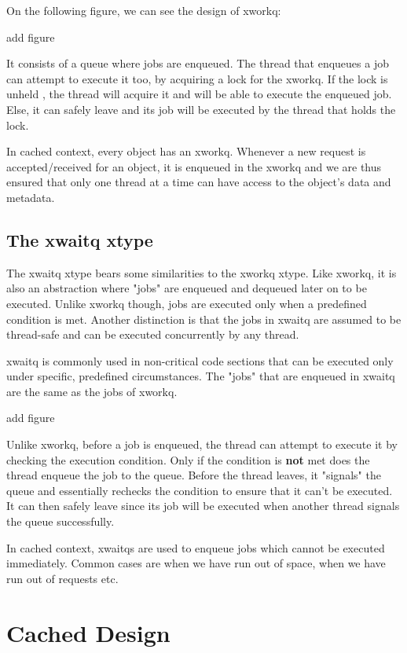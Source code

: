 On the following figure, we can see the design of xworkq:

\fixme add figure

It consists of a queue where jobs are enqueued.  The thread that enqueues a job 
can attempt to execute it too, by acquiring a lock for the xworkq. If the lock 
is unheld%
, the thread will acquire it and will be able to execute the enqueued job.  
Else, it can safely leave and its job will be executed by the thread that holds 
the lock.

In cached context, every object has an xworkq. Whenever a new request is 
accepted/received for an object, it is enqueued in the xworkq and we are thus 
ensured that only one thread at a time can have access to the object's data and 
metadata.

\subsection{The xwaitq xtype}\label{sec:xwaitq-design}

The xwaitq xtype bears some similarities to the xworkq xtype. Like xworkq, it 
is also an abstraction where "jobs" are enqueued and dequeued later on to be 
executed. Unlike xworkq though, jobs are executed only when a predefined 
condition is met. Another distinction is that the jobs in xwaitq are assumed to 
be thread-safe and can be executed concurrently by any thread.  

xwaitq is commonly used in non-critical code sections that can be executed only 
under specific, predefined circumstances. The "jobs" that are enqueued in 
xwaitq are the same as the jobs of xworkq.

\fixme add figure

Unlike xworkq, before a job is enqueued, the thread can attempt to execute it 
by checking the execution condition. Only if the condition is \textbf{not} met 
does the thread enqueue the job to the queue. Before the thread leaves, it 
"signals" the queue and essentially rechecks the condition to ensure that it 
can't be executed. It can then safely leave since its job will be executed when 
another thread signals the queue successfully.

In cached context, xwaitqs are used to enqueue jobs which cannot be executed 
immediately. Common cases are when we have run out of space, when we have run 
out of requests etc.

\section{Cached Design}\label{sec:cached-design}


